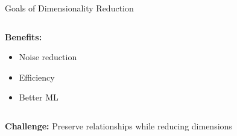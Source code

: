 \documentclass{beamer}
\begin{document}
\begin{frame}{Goals of Dimensionality Reduction}
\begin{columns}[T]
\begin{column}{0.48\textwidth}
\begin{center}
\end{center}

\small
\textcolor{upcgray}{\textbf{Benefits:}}
\begin{itemize}
    \footnotesize
    \item Noise reduction
    \item Efficiency
    \item Better ML
\end{itemize}
\end{column}
\end{columns}

\vspace{0.3cm}
\begin{center}
\colorbox{upcblue!10}{
\begin{minipage}{0.85\textwidth}
\centering
\small\textbf{Challenge:} Preserve relationships while reducing dimensions
\end{minipage}
}
\end{center}
\end{frame}
\end{document}
